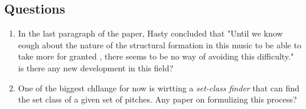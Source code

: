 \documentclass[12pt]{report}
\begin{document}
\subsection*{Questions}
\begin{enumerate}
    \item In the last paragraph of the paper, Hasty concluded 
    that "Until we know eough about the nature of the structural
    formation in this music to be able to take more for granted
    , there seems to be no way of avoiding this difficulty." is 
    there any new development in this field?
    \item One of the biggest chllange for now is wirtting a 
    \textit{set-class finder} that can find the set class 
    of a given set of pitches. Any paper on formulizing this process?
\end{enumerate}
\end{document}
